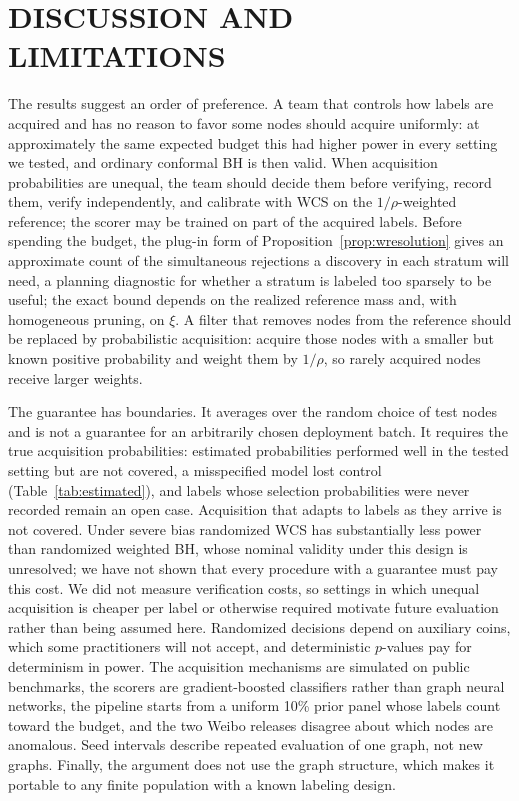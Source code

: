 \documentclass[twoside]{article}
\begin{document}
\section{DISCUSSION AND LIMITATIONS}
The results suggest an order of preference. A team that controls how labels are acquired and has no reason to favor some nodes should acquire uniformly: at approximately the same expected budget this had higher power in every setting we tested, and ordinary conformal BH is then valid. When acquisition probabilities are unequal, the team should decide them before verifying, record them, verify independently, and calibrate with WCS on the $1/\rho$-weighted reference; the scorer may be trained on part of the acquired labels. Before spending the budget, the plug-in form of Proposition~\ref{prop:wresolution} gives an approximate count of the simultaneous rejections a discovery in each stratum will need, a planning diagnostic for whether a stratum is labeled too sparsely to be useful; the exact bound depends on the realized reference mass and, with homogeneous pruning, on $\xi$. A filter that removes nodes from the reference should be replaced by probabilistic acquisition: acquire those nodes with a smaller but known positive probability and weight them by $1/\rho$, so rarely acquired nodes receive larger weights.

The guarantee has boundaries. It averages over the random choice of test nodes and is not a guarantee for an arbitrarily chosen deployment batch. It requires the true acquisition probabilities: estimated probabilities performed well in the tested setting but are not covered, a misspecified model lost control (Table~\ref{tab:estimated}), and labels whose selection probabilities were never recorded remain an open case. Acquisition that adapts to labels as they arrive is not covered. Under severe bias randomized WCS has substantially less power than randomized weighted BH, whose nominal validity under this design is unresolved; we have not shown that every procedure with a guarantee must pay this cost. We did not measure verification costs, so settings in which unequal acquisition is cheaper per label or otherwise required motivate future evaluation rather than being assumed here. Randomized decisions depend on auxiliary coins, which some practitioners will not accept, and deterministic $p$-values pay for determinism in power. The acquisition mechanisms are simulated on public benchmarks, the scorers are gradient-boosted classifiers rather than graph neural networks, the pipeline starts from a uniform 10\% prior panel whose labels count toward the budget, and the two Weibo releases disagree about which nodes are anomalous. Seed intervals describe repeated evaluation of one graph, not new graphs. Finally, the argument does not use the graph structure, which makes it portable to any finite population with a known labeling design.
\end{document}
